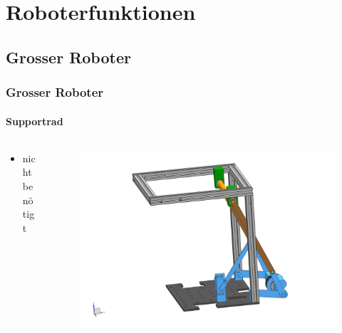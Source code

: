 \section{Roboterfunktionen}
\subsection{Grosser Roboter}

\begin{frame}
	\frametitle{Grosser Roboter}
	\framesubtitle{Supportrad}
	\begin{columns}
		\begin{column}{0.42 \textwidth}
			\begin{itemize}
				\item nicht benötigt
			\end{itemize}
		\end{column}
		\begin{column}{0.58 \textwidth}
			\vspace{-2.8em}
			\begin{figure}[h]
				\centering
				\includegraphics[width = 1 \textwidth]{../images/presentation/supportrad.png}
			\end{figure}
		\end{column}
	\end{columns}
\end{frame}

